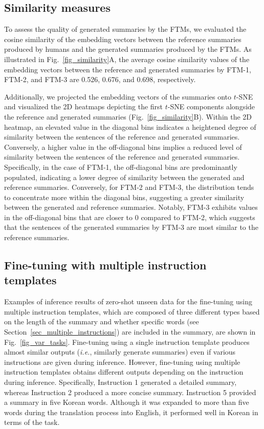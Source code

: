 \documentclass[sigconf]{acmart}
\begin{document}
\subsection{Similarity measures}
To assess the quality of generated summaries by the FTMs, we evaluated the cosine similarity of the embedding vectors between the reference summaries produced by humans and the generated summaries produced by the FTMs. As illustrated in Fig.~\ref{fig_similarity}A, the average cosine similarity values of the embedding vectors between the reference and generated summaries by FTM-1, FTM-2, and FTM-3 are 0.526, 0.676, and 0.698, respectively.


Additionally, we projected the embedding vectors of the summaries onto $t$-SNE and visualized the 2D heatmaps depicting the first $t$-SNE components alongside the reference and generated summaries (Fig.~\ref{fig_similarity}B). Within the 2D heatmap, an elevated value in the diagonal bins indicates a heightened degree of similarity between the sentences of the reference and generated summaries. Conversely, a higher value in the off-diagonal bins implies a reduced level of similarity between the sentences of the reference and generated summaries. Specifically, in the case of FTM-1, the off-diagonal bins are predominantly populated, indicating a lower degree of similarity between the generated and reference summaries. Conversely, for FTM-2 and FTM-3, the distribution tends to concentrate more within the diagonal bins, suggesting a greater similarity between the generated and  reference summaries. Notably, FTM-3 exhibits values in the off-diagonal bins that are closer to 0 compared to FTM-2, which suggests that the sentences of the generated summaries by FTM-3 are most similar to the reference summaries.






\subsection{Fine-tuning with multiple instruction templates}
Examples of inference results of zero-shot unseen data for the fine-tuning using multiple instruction templates, which are composed of three different types based on the length of the summary and whether specific words (see Section~\ref{sec_multiple_instructions}) are included in the summary, are shown in Fig.~\ref{fig_var_tasks}. Fine-tuning using a single instruction template produces almost similar outputs ({\it i.e.}, similarly generate summaries) even if various instructions are given during inference. However, fine-tuning using multiple instruction templates obtains different outputs depending on the instruction during inference. Specifically, Instruction 1 generated a detailed summary, whereas Instruction 2 produced a more concise summary. Instruction 5 provided a summary in five Korean words. Although it was expanded to more than five words during the translation process into English, it performed well in Korean in terms of the task. 
\end{document}
